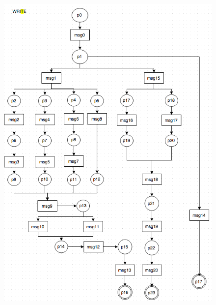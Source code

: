 \documentclass[conference]{IEEEtran}
\begin{document}
 \begin{figure} 
 \centerline{
 \includegraphics[width=3.4In]{figures/Fig5.png}}
 

\end{figure}
\end{document}
